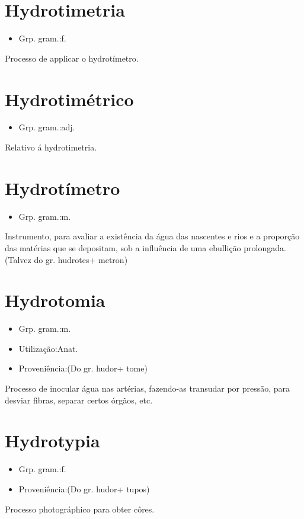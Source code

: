 \documentclass{article}
\begin{document}
\section{Hydrotimetria}
\begin{itemize}
\item {Grp. gram.:f.}
\end{itemize}
Processo de applicar o hydrotímetro.
\section{Hydrotimétrico}
\begin{itemize}
\item {Grp. gram.:adj.}
\end{itemize}
Relativo á hydrotimetria.
\section{Hydrotímetro}
\begin{itemize}
\item {Grp. gram.:m.}
\end{itemize}
Instrumento, para avaliar a existência da água das nascentes e rios e a proporção das matérias que se depositam, sob a influência de uma ebullição prolongada.
(Talvez do gr. \textunderscore hudrotes\textunderscore  + \textunderscore metron\textunderscore )
\section{Hydrotomia}
\begin{itemize}
\item {Grp. gram.:m.}
\end{itemize}
\begin{itemize}
\item {Utilização:Anat.}
\end{itemize}
\begin{itemize}
\item {Proveniência:(Do gr. \textunderscore hudor\textunderscore  + \textunderscore tome\textunderscore )}
\end{itemize}
Processo de inocular água nas artérias, fazendo-as transudar por pressão, para desviar fibras, separar certos órgãos, etc.
\section{Hydrotypia}
\begin{itemize}
\item {Grp. gram.:f.}
\end{itemize}
\begin{itemize}
\item {Proveniência:(Do gr. \textunderscore hudor\textunderscore  + \textunderscore tupos\textunderscore )}
\end{itemize}
Processo photográphico para obter côres.
\end{document}
